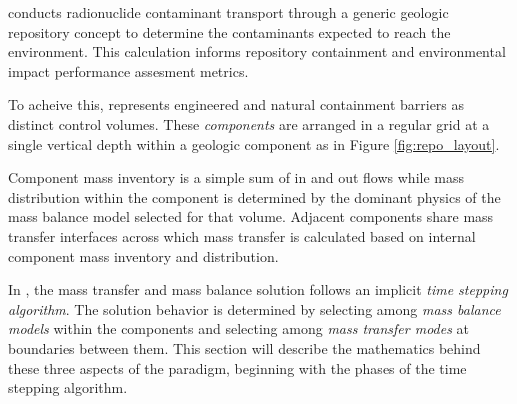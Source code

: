 \Cyder conducts radionuclide contaminant transport through a generic geologic 
repository concept to determine the contaminants expected to reach the 
environment. This calculation informs repository containment and environmental 
impact performance assesment metrics.

To acheive this, \Cyder represents engineered and natural containment barriers as
distinct control volumes. These \emph{components} are arranged in a regular
grid at a single vertical depth within a geologic component as in Figure
\ref{fig:repo_layout}.



Component mass inventory is a simple sum of in and out flows while mass
distribution within the component is determined by the dominant physics of the
mass balance model selected for that volume.  Adjacent components share mass
transfer interfaces across which mass transfer is calculated based on internal
component mass inventory and distribution.

In \Cyder, the mass transfer and mass balance solution follows an implicit
\emph{time stepping algorithm}. The solution behavior is determined by selecting
among \emph{mass balance models} within the components and selecting
among \emph{mass transfer modes} at boundaries between them. This section will describe
the mathematics behind these three aspects of the \Cyder paradigm, beginning
with the phases of the time stepping algorithm.
